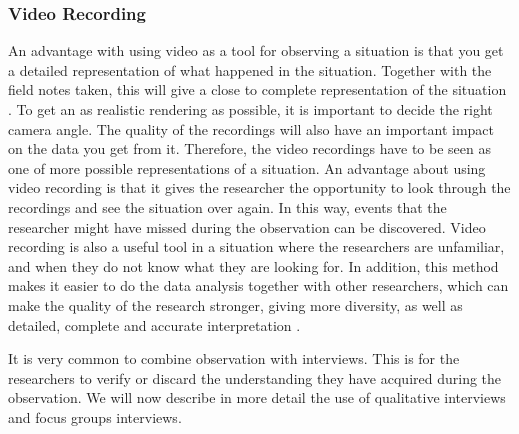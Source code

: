 \subsubsection{Video Recording}
An advantage with using video as a tool for observing a situation is that you get a detailed representation of what happened in the situation. Together with the field notes taken, this will give a close to complete representation of the situation \cite{tjora}. To get an as realistic rendering as possible, it is important to decide the right camera angle. The quality of the recordings will also have an important impact on the data you get from it. Therefore, the video recordings have to be seen as one of more possible representations of a situation.  An advantage about using video recording is that it gives the researcher the opportunity to look through the recordings and see the situation over again. In this way, events that the researcher might have missed during the observation can be discovered. Video recording is also a useful tool in a situation where the researchers are unfamiliar, and when they do not know what they are looking for. In addition, this method makes it easier to do the data analysis together with other researchers, which can make the quality of the research stronger, giving more diversity, as well as detailed, complete and accurate interpretation \cite{tjora}.

It is very common to combine observation with interviews. This is for the researchers to verify or discard the understanding they have acquired during the observation. We will now describe in more detail the use of qualitative interviews and focus groups interviews. 

